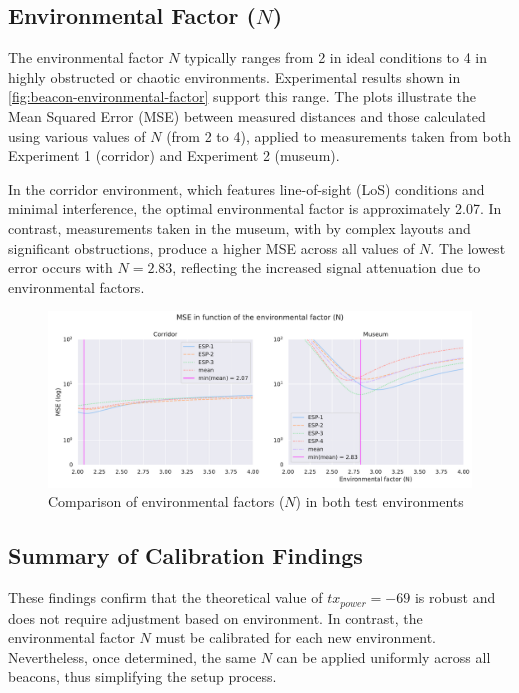 \subsection{Environmental Factor ($N$)}
The environmental factor $N$ typically ranges from 2 in ideal conditions to 4 in highly obstructed or chaotic environments. Experimental results shown in \autoref{fig:beacon-environmental-factor} support this range. The plots illustrate the Mean Squared Error (MSE) between measured distances and those calculated using various values of $N$ (from 2 to 4), applied to measurements taken from both Experiment 1 (corridor) and Experiment 2 (museum).

In the corridor environment, which features line-of-sight (LoS) conditions and minimal interference, the optimal environmental factor is approximately 2.07. In contrast, measurements taken in the museum, with by complex layouts and significant obstructions, produce a higher MSE across all values of $N$. The lowest error occurs with $N = 2.83$, reflecting the increased signal attenuation due to environmental factors.

\begin{figure}[h]
    \centering
    \includegraphics[width=\linewidth]{assets/beacons-environmental-factor.pdf}
    \caption{Comparison of environmental factors ($N$) in both test environments}
    \label{fig:beacon-environmental-factor}
\end{figure}

\subsection{Summary of Calibration Findings}

These findings confirm that the theoretical value of $tx_{power} = -69$ is robust and does not require adjustment based on environment. In contrast, the environmental factor $N$ must be calibrated for each new environment. Nevertheless, once determined, the same $N$ can be applied uniformly across all beacons, thus simplifying the setup process.

